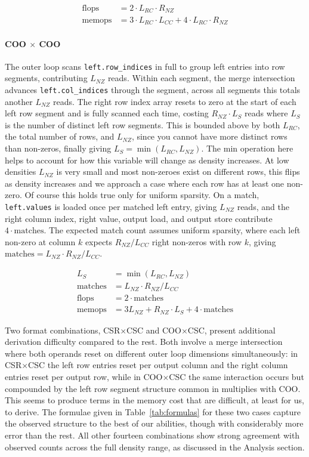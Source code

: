 \begin{align}
\text{flops}  &= 2 \cdot L_{RC} \cdot R_{NZ} \\
\text{memops} &= 3 \cdot L_{RC} \cdot L_{CC} + 4 \cdot L_{RC} \cdot R_{NZ}
\end{align}

\paragraph{COO $\times$ COO}
The outer loop scans \texttt{left.row\_indices} in full to group left entries into row segments,
contributing $L_{NZ}$ reads. Within each segment, the merge intersection advances
\texttt{left.col\_indices} through the segment, across all segments this totals
another $L_{NZ}$ reads. The right row index array resets to zero at the start of each left row
segment and is fully scanned each time, costing $R_{NZ} \cdot L_S$ reads where $L_S$ is the
number of distinct left row segments. This is bounded above by both $L_{RC}$, the total number
of rows, and $L_{NZ}$, since you cannot have more distinct rows than non-zeros, finally giving
$L_S = \min(L_{RC}, L_{NZ})$. The min operation here helps to account for how this variable will change as density increases. At low densities $L_{NZ}$ is very small and most non-zeroes exist on different rows, this flips as density increases and we approach a case where each row has at least one non-zero. Of course this holds true only for uniform sparsity. On a match, \texttt{left.values} is loaded once per matched left
entry, giving $L_{NZ}$ reads, and the right column index, right value, output load, and output
store contribute $4 \cdot \text{matches}$. The expected match count assumes uniform sparsity,
where each left non-zero at column $k$ expects $R_{NZ} / L_{CC}$ right non-zeros with row $k$,
giving $\text{matches} = L_{NZ} \cdot R_{NZ} / L_{CC}$.

\begin{align}
L_S &= \min(L_{RC}, L_{NZ}) \\
\text{matches} &= L_{NZ} \cdot R_{NZ} / L_{CC} \\
\text{flops}  &= 2 \cdot \text{matches} \\
\text{memops} &= 3L_{NZ} + R_{NZ} \cdot L_S + 4 \cdot \text{matches}
\end{align}

Two format combinations, CSR$\times$CSC and COO$\times$CSC, present additional derivation
difficulty compared to the rest. Both involve a merge intersection where both operands
reset on different outer loop dimensions simultaneously: in CSR$\times$CSC the left row entries
reset per output column and the right column entries reset per output row, while in
COO$\times$CSC the same interaction occurs but compounded by the left row segment
structure common in multiplies with COO. This seems to produce terms in the memory
cost that are difficult, at least for us, to derive. The formulae given in
Table~\ref{tab:formulas} for these two cases capture the observed structure to the best
of our abilities, though with considerably more error than the rest. All other
fourteen combinations show strong agreement with observed counts across the full density range,
as discussed in the Analysis section.

